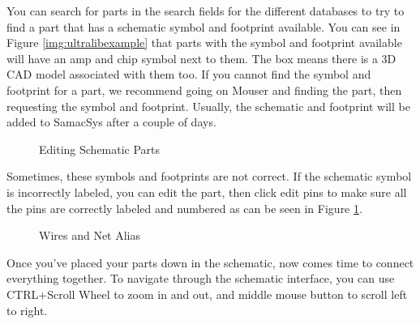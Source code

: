 You can search for parts in the search fields for the different databases to try to find a part that has a schematic symbol
and footprint available. You can see in Figure \ref{img:ultralibexample} that parts with the symbol and footprint available will
have an amp and chip symbol next to them. The box means there is a 3D CAD model associated with them too. If you cannot find
the symbol and footprint for a part, we recommend going on Mouser and finding the part, then requesting the symbol and footprint.
Usually, the schematic and footprint will be added to SamacSys after a couple of days.

\begin{figure}[H]
\caption{Editing Schematic Parts}
\label{img:editpart}
\end{figure}

Sometimes, these symbols and footprints are not correct. If the schematic symbol is incorrectly labeled, you can edit the part,
then click edit pins to make sure all the pins are correctly labeled and numbered as can be seen in Figure \ref{img:editpart}.

\begin{figure}[H]
\caption{Wires and Net Alias}
\label{img:wirealias}
\end{figure}

Once you've placed your parts down in the schematic, now comes time to connect everything together. To navigate through the
schematic interface, you can use CTRL+Scroll Wheel to zoom in and out, and middle mouse button to scroll left to right.

